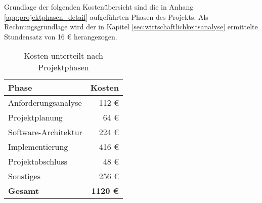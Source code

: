 \label{app:kosten}

Grundlage der folgenden Kostenübersicht sind die in Anhang \ref{app:projektphasen_detail} aufgeführten Phasen des Projekts.
Als Rechnungsgrundlage wird der in Kapitel \ref{sec:wirtschaftlichkeitsanalyse} ermittelte Stundensatz von 16 \euro{} herangezogen.

\begin{table}[H]
	\centering
	\begin{tabular}{lr}

		\rowcolor{white!15}
		\textbf{Phase} & \textbf{Kosten}  \\\hline


		Anforderungsanalyse		& 112 \euro \\
		Projektplanung			& 64 \euro \\
		Software-Architektur	& 224 \euro \\
		Implementierung			& 416 \euro \\
		Projektabschluss		& 48 \euro \\
		Sonstiges				& 256 \euro \\\hline
		\textbf{Gesamt}			& \textbf{1120 \euro}


	\end{tabular}

	\caption{Kosten unterteilt nach Projektphasen}
	\label{tab:kosten_detail}
\end{table}

